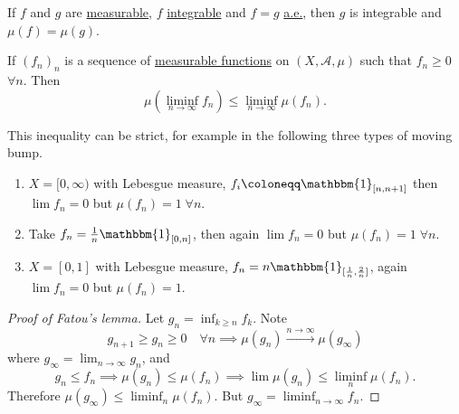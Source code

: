 \documentclass{article}
\newcommand{\1}[1]{\mathbbm{1}_{#1}}
\begin{document}
\begin{remark}
    If $f$ and $g$ are \hyperlink{def:measurableFunc}{measurable}, $f$ \hyperlink{def:integral}{integrable} and $f = g$ \hyperlink{def:ae}{a.e.}, then $g$ is integrable and $\mu(f) = \mu(g)$.
\end{remark}

\begin{thm}
    If $(f_n)_n$ is a sequence of \hyperlink{def:measurableFunc}{measurable functions} on $(X, \mathcal{A}, \mu)$ such that $f_n \geq 0$ $\forall n$.
    Then
    \begin{equation*}
        \mu(\liminf_{n \to \infty} f_n) \leq \liminf_{n \to \infty} \mu(f_n).
    \end{equation*}
\end{thm}

\begin{remark}
    This inequality can be strict, for example in the following three types of moving bump.
    \begin{enumerate}[label=(\alph*)]
        \item $X = [0, \infty)$ with Lebesgue measure, $f_i \coloneqq \1{[n, n+1]}$ then $\lim f_n = 0$ but $\mu(f_n) = 1 \; \forall n$.
        \item Take $f_n = \frac{1}{n} \1{[0, n]}$, then again $\lim f_n = 0$ but $\mu(f_n) = 1 \; \forall n$.
        \item $X = [0, 1]$ with Lebesgue measure, $f_n = n \1{[\frac{1}{n}, \frac{2}{n}]}$, again $\lim f_n = 0$ but $\mu(f_n) = 1$.
    \end{enumerate}
\end{remark}

\begin{proof}[Proof of Fatou's lemma]
    Let $g_n = \inf_{k \geq n} f_k$.
    Note
    \begin{equation*}
        g_{n + 1} \geq g_n \geq 0\quad \forall n \implies \mu(g_n) \xrightarrow{n \to \infty} \mu(g_\infty)
    \end{equation*}
    where $g_\infty = \lim_{n \to \infty} g_n$, and
    \begin{equation*}
        g_n \leq f_n \implies \mu(g_n) \leq \mu(f_n) \implies \lim \mu(g_n) \leq \liminf_n \mu(f_n).
    \end{equation*}
    Therefore $\mu(g_\infty) \leq \liminf_n \mu(f_n)$. But $g_\infty = \liminf_{n \to \infty} f_n$.
\end{proof}
\end{document}
